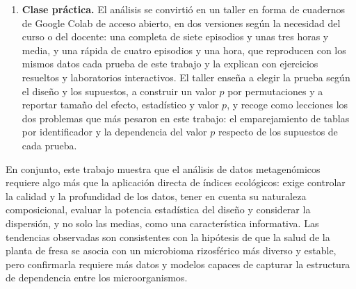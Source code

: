 \begin{enumerate}
    \item \textbf{Clase práctica.} El análisis se convirtió en un taller en forma de cuadernos de
    Google Colab de acceso abierto, en dos versiones según la necesidad del curso o del docente: una
    completa de siete episodios y unas tres horas y media, y una rápida de cuatro episodios y una
    hora, que reproducen con los mismos datos cada prueba de este trabajo y la explican con
    ejercicios resueltos y laboratorios interactivos. El taller enseña a elegir la prueba según el
    diseño y los supuestos, a construir un valor $p$ por permutaciones y a reportar tamaño del
    efecto, estadístico y valor $p$, y recoge como lecciones los dos problemas que más pesaron en
    este trabajo: el emparejamiento de tablas por identificador y la dependencia del valor $p$
    respecto de los supuestos de cada prueba.
\end{enumerate}

En conjunto, este trabajo muestra que el análisis de datos metagenómicos requiere algo más que la
aplicación directa de índices ecológicos: exige controlar la calidad y la profundidad de los datos,
tener en cuenta su naturaleza composicional, evaluar la potencia estadística del diseño y considerar
la dispersión, y no solo las medias, como una característica informativa. Las tendencias observadas
son consistentes con la hipótesis de que la salud de la planta de fresa se asocia con un microbioma
rizosférico más diverso y estable, pero confirmarla requiere más datos y modelos capaces de capturar
la estructura de dependencia entre los microorganismos.
